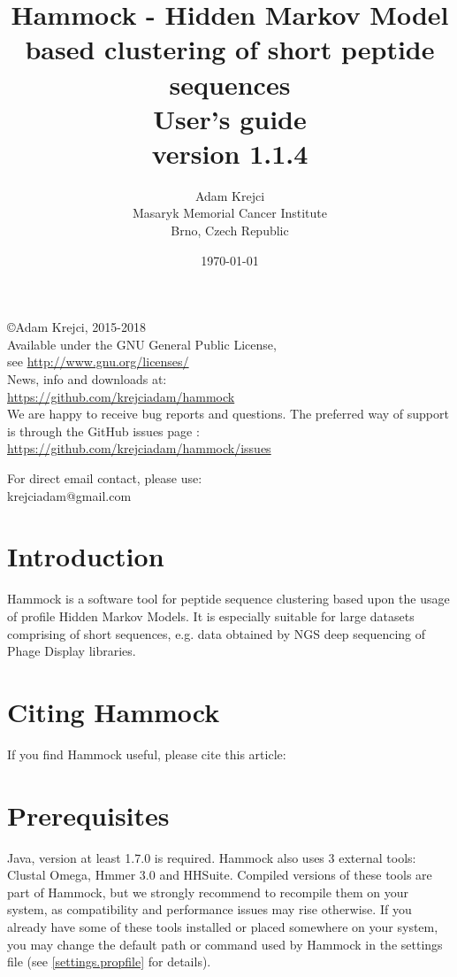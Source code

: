 \documentclass[11pt, a4paper, twoside, titlepage]{article}
\title{Hammock - Hidden Markov Model based clustering of short peptide sequences\\ \vspace{2 mm} {\large User's guide} \\ \vspace{2 mm} {\small version 1.1.4}}
\author{Adam Krejci  \\
	Masaryk Memorial Cancer Institute\\
	Brno, Czech Republic
	}
\date{\today}
\begin{document}
\maketitle

\begin{center}
\copyright Adam Krejci, 2015-2018 \\ \vspace{1cm}
Available under the GNU General Public License, \\
see \url{http://www.gnu.org/licenses/} \\ \vspace{1cm}
News, info and downloads at: \\
\url{https://github.com/krejciadam/hammock} \\ \vspace{1cm}
We are happy to receive bug reports and questions. The preferred way of support is through the GitHub issues page : \\
 \url{https://github.com/krejciadam/hammock/issues}

 For direct email contact, please use: \\
krejciadam@gmail.com
\end{center} 
\newpage



\tableofcontents

\newpage

\section{Introduction}
\label{introduction}
Hammock is a software tool for peptide sequence clustering based upon the usage of profile Hidden Markov Models. It is especially suitable for large datasets comprising of short sequences, e.g. data obtained by NGS deep sequencing of Phage Display libraries.


\section{Citing Hammock}
If you find Hammock useful, please cite this article: \newline




\section{Prerequisites}
\label{prerequisities}
Java, version at least 1.7.0 is required. Hammock also uses 3 external tools: Clustal Omega\cite{Sievers2011}, Hmmer 3.0\citep{Finn2011} and HHSuite\citep{Soding2004}. Compiled versions of these tools are part of Hammock, but we strongly recommend to recompile them on your system, as compatibility and performance issues may rise otherwise. If you already have some of these tools installed or placed somewhere on your system, you may change the default path or command used by Hammock in the settings file (see \ref{settings.propfile} for details). 
\end{document}
